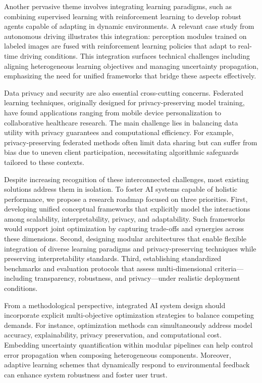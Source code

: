 \documentclass[sigconf]{acmart}
\begin{document}
Another pervasive theme involves integrating learning paradigms, such as combining supervised learning with reinforcement learning to develop robust agents capable of adapting in dynamic environments. A relevant case study from autonomous driving illustrates this integration: perception modules trained on labeled images are fused with reinforcement learning policies that adapt to real-time driving conditions. This integration surfaces technical challenges including aligning heterogeneous learning objectives and managing uncertainty propagation, emphasizing the need for unified frameworks that bridge these aspects effectively.

Data privacy and security are also essential cross-cutting concerns. Federated learning techniques, originally designed for privacy-preserving model training, have found applications ranging from mobile device personalization to collaborative healthcare research. The main challenge lies in balancing data utility with privacy guarantees and computational efficiency. For example, privacy-preserving federated methods often limit data sharing but can suffer from bias due to uneven client participation, necessitating algorithmic safeguards tailored to these contexts.

Despite increasing recognition of these interconnected challenges, most existing solutions address them in isolation. To foster AI systems capable of holistic performance, we propose a research roadmap focused on three priorities. First, developing unified conceptual frameworks that explicitly model the interactions among scalability, interpretability, privacy, and adaptability. Such frameworks would support joint optimization by capturing trade-offs and synergies across these dimensions. Second, designing modular architectures that enable flexible integration of diverse learning paradigms and privacy-preserving techniques while preserving interpretability standards. Third, establishing standardized benchmarks and evaluation protocols that assess multi-dimensional criteria—including transparency, robustness, and privacy—under realistic deployment conditions.

From a methodological perspective, integrated AI system design should incorporate explicit multi-objective optimization strategies to balance competing demands. For instance, optimization methods can simultaneously address model accuracy, explainability, privacy preservation, and computational cost. Embedding uncertainty quantification within modular pipelines can help control error propagation when composing heterogeneous components. Moreover, adaptive learning schemes that dynamically respond to environmental feedback can enhance system robustness and foster user trust.
\end{document}
